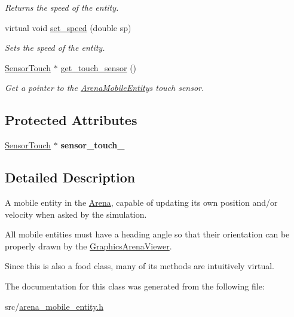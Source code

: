 \begin{DoxyCompactItemize}
\begin{DoxyCompactList}\small\item\em Returns the speed of the entity. \end{DoxyCompactList}\item 
\mbox{\label{class_arena_mobile_entity_a1a047f4377a9557516a2e1d6d73db849}} 
virtual void \mbox{\hyperlink{class_arena_mobile_entity_a1a047f4377a9557516a2e1d6d73db849}{set\+\_\+speed}} (double sp)
\begin{DoxyCompactList}\small\item\em Sets the speed of the entity. \end{DoxyCompactList}\item 
\mbox{\label{class_arena_mobile_entity_ae9507f1b0c6bfdfd62afbab8a9a150f7}} 
\mbox{\hyperlink{class_sensor_touch}{Sensor\+Touch}} $\ast$ \mbox{\hyperlink{class_arena_mobile_entity_ae9507f1b0c6bfdfd62afbab8a9a150f7}{get\+\_\+touch\+\_\+sensor}} ()
\begin{DoxyCompactList}\small\item\em Get a pointer to the \mbox{\hyperlink{class_arena_mobile_entity}{Arena\+Mobile\+Entity}}\textquotesingle{}s touch sensor. \end{DoxyCompactList}\end{DoxyCompactItemize}
\subsection*{Protected Attributes}
\begin{DoxyCompactItemize}
\item 
\mbox{\label{class_arena_mobile_entity_a260fd3fba196ee9ab56f9f2ce6ab4a21}} 
\mbox{\hyperlink{class_sensor_touch}{Sensor\+Touch}} $\ast$ {\bfseries sensor\+\_\+touch\+\_\+}
\end{DoxyCompactItemize}


\subsection{Detailed Description}
A mobile entity in the \mbox{\hyperlink{class_arena}{Arena}}, capable of updating its own position and/or velocity when asked by the simulation. 

All mobile entities must have a heading angle so that their orientation can be properly drawn by the \mbox{\hyperlink{class_graphics_arena_viewer}{Graphics\+Arena\+Viewer}}.

Since this is also a food class, many of its methods are intuitively {\ttfamily virtual}. 

The documentation for this class was generated from the following file\+:\begin{DoxyCompactItemize}
\item 
src/\mbox{\hyperlink{arena__mobile__entity_8h}{arena\+\_\+mobile\+\_\+entity.\+h}}\end{DoxyCompactItemize}
